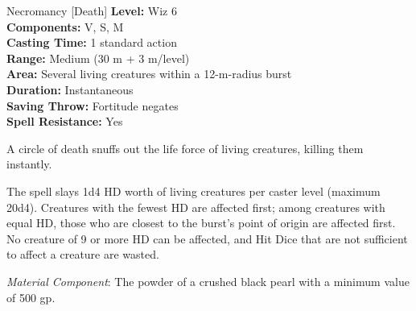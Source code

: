 {Necromancy [Death]}
{
	\textbf{Level:}
	Wiz 6\\
	\textbf{Components:}
	V, S, M\\
	\textbf{Casting Time:}
	1 standard action\\
	\textbf{Range:}
	Medium (30 m + 3 m/level)\\
	\textbf{Area:}
	Several living creatures within a 12-m-radius burst\\
	\textbf{Duration:}
	Instantaneous\\
	\textbf{Saving Throw:}
	Fortitude negates\\
	\textbf{Spell Resistance:}
	Yes\\
}
{
	A circle of death snuffs out the life force of living creatures, killing them instantly.

	The spell slays 1d4 HD worth of living creatures per caster level (maximum 20d4). Creatures with the fewest HD are affected first; among creatures with equal HD, those who are closest to the burst's point of origin are affected first. No creature of 9 or more HD can be affected, and Hit Dice that are not sufficient to affect a creature are wasted.

	\textit{Material Component}:
	The powder of a crushed black pearl with a minimum value of 500 gp.

}
